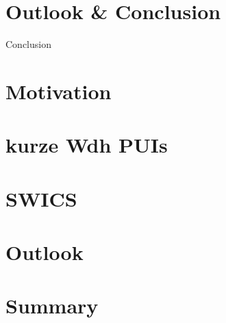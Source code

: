 \documentclass{beamer}
\begin{document}

\begin{frame}{}

\end{frame}


\begin{frame}{}

\end{frame}


\section{Outlook \& Conclusion}

\begin{frame}[plain]{Conclusion}

\end{frame}

%
%
%
\section{Motivation}
\section{kurze Wdh PUIs}
\section{SWICS}

\section{Outlook}
\section{Summary}
%
%
%
\end{document}
